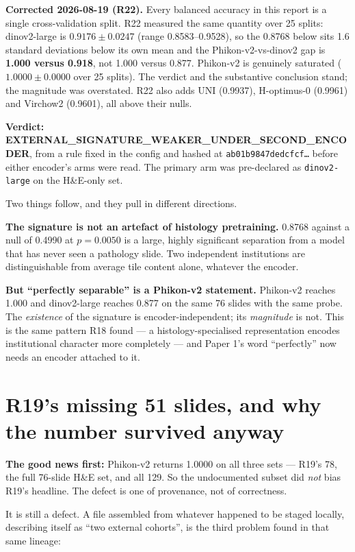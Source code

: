 \documentclass[11pt,a4paper]{article}
\begin{document}
\textcolor{qred}{\textbf{Corrected 2026-08-19 (R22).} Every balanced accuracy in this report is a
single cross-validation split. R22 measured the same quantity over 25 splits: dinov2-large is
$0.9176 \pm 0.0247$ (range 0.8583--0.9528), so the 0.8768 below sits 1.6 standard deviations below
its own mean and the Phikon-v2-vs-dinov2 gap is \textbf{1.000 versus 0.918}, not 1.000 versus 0.877.
Phikon-v2 is genuinely saturated ($1.0000 \pm 0.0000$ over 25 splits). The verdict and the
substantive conclusion stand; the magnitude was overstated. R22 also adds UNI (0.9937), H-optimus-0
(0.9961) and Virchow2 (0.9601), all above their nulls.}

\medskip
\noindent\textbf{Verdict: EXTERNAL\_SIGNATURE\_WEAKER\_UNDER\_SECOND\_ENCODER}, from a rule fixed in the
config and hashed at \texttt{ab01b9847dedcfcf\ldots} before either encoder's arms were read. The
primary arm was pre-declared as \texttt{dinov2-large} on the H\&E-only set.

Two things follow, and they pull in different directions.

\textbf{The signature is not an artefact of histology pretraining.} 0.8768 against a null of 0.4990
at $p = 0.0050$ is a large, highly significant separation from a model that has never seen a
pathology slide. Two independent institutions are distinguishable from average tile content alone,
whatever the encoder.

\textbf{But ``perfectly separable'' is a Phikon-v2 statement.} Phikon-v2 reaches 1.000 and
dinov2-large reaches 0.877 on the same 76 slides with the same probe. The
\emph{existence} of the signature is encoder-independent; its \emph{magnitude} is not. This is the
same pattern R18 found --- a histology-specialised representation encodes institutional character
more completely --- and Paper 1's word ``perfectly'' now needs an encoder attached to it.

\section{R19's missing 51 slides, and why the number survived anyway}

\textcolor{qgreen}{\textbf{The good news first:}} Phikon-v2 returns 1.0000 on all three sets ---
R19's 78, the full 76-slide H\&E set, and all 129. So the undocumented subset did \emph{not} bias
R19's headline. The defect is one of provenance, not of correctness.

It is still a defect. A file assembled from whatever happened to be staged locally, describing
itself as ``two external cohorts'', is the third problem found in that same lineage:
\end{document}
